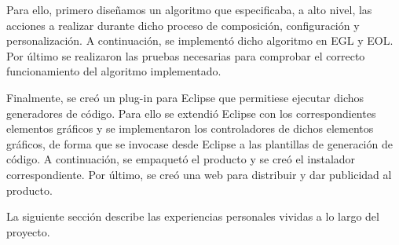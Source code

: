 Para ello, primero diseñamos un algoritmo que especificaba, a alto nivel, las acciones a realizar durante dicho proceso de composición, configuración y personalización. A continuación, se implementó dicho algoritmo en EGL y EOL. Por último se realizaron las pruebas necesarias para comprobar el correcto funcionamiento del algoritmo implementado.

Finalmente, se creó un plug-in para Eclipse que permitiese ejecutar dichos generadores de código. Para ello se extendió Eclipse con los correspondientes elementos gráficos y se implementaron los controladores de dichos elementos gráficos, de forma que se invocase desde Eclipse a las plantillas de generación de código. A continuación, se empaquetó el producto y se creó el instalador correspondiente. Por último, se creó una web para distribuir y dar publicidad al producto. 

La siguiente sección describe las experiencias personales vividas a lo largo del proyecto.












